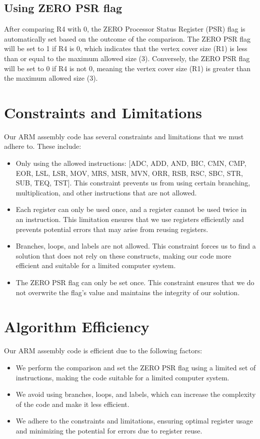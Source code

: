 \subsection{Using ZERO PSR flag}
After comparing R4 with 0, the ZERO Processor Status Register (PSR) flag is automatically set based on the outcome of the comparison. The ZERO PSR flag will be set to 1 if R4 is 0, which indicates that the vertex cover size (R1) is less than or equal to the maximum allowed size (3). Conversely, the ZERO PSR flag will be set to 0 if R4 is not 0, meaning the vertex cover size (R1) is greater than the maximum allowed size (3).

\section{Constraints and Limitations}
Our ARM assembly code has several constraints and limitations that we must adhere to. These include:

\begin{itemize}
    \item Only using the allowed instructions: [ADC, ADD, AND, BIC, CMN, CMP, EOR, LSL, LSR, MOV, MRS, MSR, MVN, ORR, RSB, RSC, SBC, STR, SUB, TEQ, TST]. This constraint prevents us from using certain branching, multiplication, and other instructions that are not allowed.
    \item Each register can only be used once, and a register cannot be used twice in an instruction. This limitation ensures that we use registers efficiently and prevents potential errors that may arise from reusing registers.
    \item Branches, loops, and labels are not allowed. This constraint forces us to find a solution that does not rely on these constructs, making our code more efficient and suitable for a limited computer system.
    \item The ZERO PSR flag can only be set once. This constraint ensures that we do not overwrite the flag's value and maintains the integrity of our solution.
\end{itemize}

\section{Algorithm Efficiency}
Our ARM assembly code is efficient due to the following factors:

\begin{itemize}
    \item We perform the comparison and set the ZERO PSR flag using a limited set of instructions, making the code suitable for a limited computer system.
    \item We avoid using branches, loops, and labels, which can increase the complexity of the code and make it less efficient.
    \item We adhere to the constraints and limitations, ensuring optimal register usage and minimizing the potential for errors due to register reuse.
\end{itemize}

